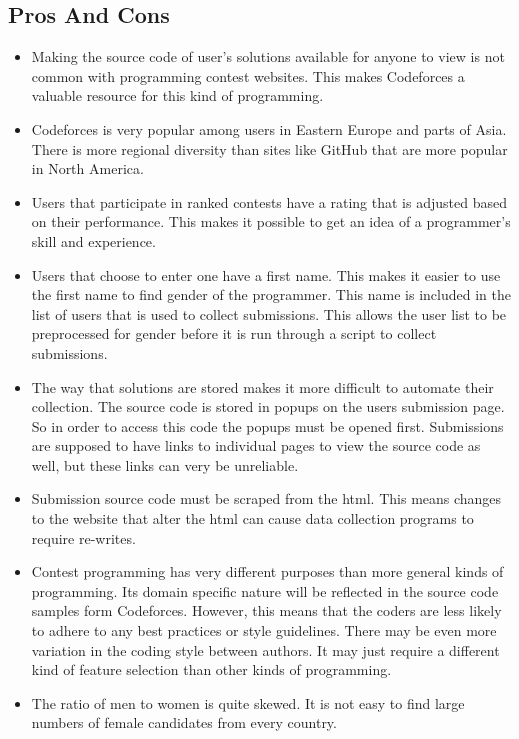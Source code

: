 \documentclass{article}
\begin{document}
\subsection{Pros And Cons}
\begin{itemize}
    \item Making the source code of user's solutions available for anyone to view is not common with programming contest websites. This makes Codeforces a valuable resource for this kind of programming.
    
    \item Codeforces is very popular among users in Eastern Europe and parts of Asia. There is more regional diversity than sites like GitHub that are more popular in North America.
    
    \item Users that participate in ranked contests have a rating that is adjusted based on their performance. This makes it possible to get an idea of a programmer's skill and experience.
    
    \item Users that choose to enter one have a first name. This makes it easier to use the first name to find gender of the programmer. This name is included in the list of users that is used to collect submissions. This allows the user list to be preprocessed for gender before it is run through a script to collect submissions.

    \item The way that solutions are stored makes it more difficult to automate their collection. The source code is stored in popups on the users submission page. So in order to access this code the popups must be opened first. Submissions are supposed to have links to individual pages to view the source code as well, but these links can very be unreliable.

    \item Submission source code must be scraped from the html. This means changes to the website that alter the html can cause data collection programs to require re-writes.

    \item Contest programming has very different purposes than more general kinds of programming. Its domain specific nature will be reflected in the source code samples form Codeforces. However, this means that the coders are less likely to adhere to any best practices or style guidelines. There may be even more variation in the coding style between authors. It may just require a different kind of feature selection than other kinds of programming.

    \item The ratio of men to women is quite skewed. It is not easy to find large numbers of female candidates from every country.
\end{itemize}
\end{document}
